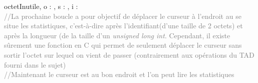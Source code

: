 \begin{algorithme}
    {octetInutile, o : \octet , s : \statistiques, i : \naturel}
    {
    	\\
    	\textcolor{gray}{//La prochaine boucle a pour objectif de déplacer le curseur à l'endroit au se situe les statistiques, c'est-à-dire après l'identifiant(d'une taille de 2 octets) et après la longueur (de la taille d'un \textit{unsigned long int}. Cependant, il existe sûrement une fonction en C qui permet de seulement déplacer le curseur sans sortir l'octet sur lequel on vient de passer (contrairement aux opérations du TAD fourni dans le sujet)}
    	{
    	}
		\\
    	\textcolor{gray}{//Maintenant le curseur est au bon endroit et l'on peut lire les statistiques}
    	{
    	}
    }
\end{algorithme}
